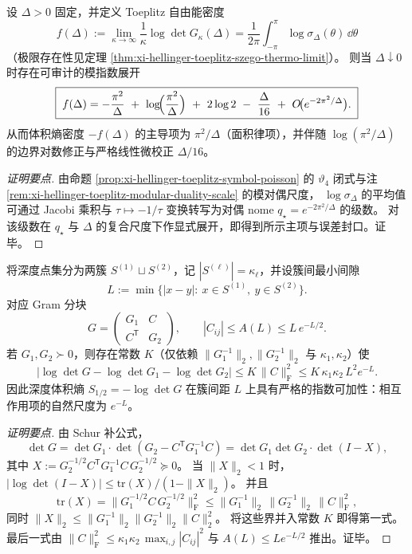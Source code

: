 \begin{theorem}\label{thm:xi-hellinger-toeplitz-free-energy-area-law}
设 \(\Delta>0\) 固定，并定义 Toeplitz 自由能密度
\[
f(\Delta):=\lim_{\kappa\to\infty}\frac{1}{\kappa}\log\det G_\kappa(\Delta)
=\frac{1}{2\pi}\int_{-\pi}^{\pi}\log\sigma_\Delta(\theta)\,\dd\theta
\]
（极限存在性见定理 \ref{thm:xi-hellinger-toeplitz-szego-thermo-limit}）。
则当 \(\Delta\downarrow0\) 时存在可审计的模指数展开
\[
\boxed{\;
f(\Delta)= -\frac{\pi^{2}}{\Delta}\ +\ \log\!\Bigl(\frac{\pi^{2}}{\Delta}\Bigr)\ +\ 2\log 2\ -\ \frac{\Delta}{16}\ +\ O\!\bigl(e^{-2\pi^{2}/\Delta}\bigr).\;}
\]
从而体积熵密度 \(-f(\Delta)\) 的主导项为 \(\pi^2/\Delta\)（面积律项），并伴随 \(\log(\pi^2/\Delta)\) 的边界对数修正与严格线性微校正 \(\Delta/16\)。
\end{theorem}
\begin{proof}[证明要点]
由命题 \ref{prop:xi-hellinger-toeplitz-symbol-poisson} 的 \(\vartheta_4\) 闭式与注 \ref{rem:xi-hellinger-toeplitz-modular-duality-scale} 的模对偶尺度，
\(\log\sigma_\Delta\) 的平均值可通过 Jacobi 乘积与 \(\tau\mapsto-1/\tau\) 变换转写为对偶 nome \(q_\star=e^{-2\pi^2/\Delta}\) 的级数。
对该级数在 \(q_\star\) 与 \(\Delta\) 的复合尺度下作显式展开，即得到所示主项与误差封口。证毕。
\end{proof}

\begin{proposition}\label{prop:xi-hellinger-gram-cluster-additivity-exp}
将深度点集分为两簇 \(S^{(1)}\sqcup S^{(2)}\)，记 \(|S^{(\ell)}|=\kappa_\ell\)，并设簇间最小间隙
\[
L:=\min\{|x-y|:\ x\in S^{(1)},\ y\in S^{(2)}\}.
\]
对应 Gram 分块
\[
G=\begin{pmatrix}G_1 & C\\ C^{\mathsf T}& G_2\end{pmatrix},
\qquad
|C_{ij}|\le A(L)\le L\,e^{-L/2}.
\]
若 \(G_1,G_2\succ0\)，则存在常数 \(K\)（仅依赖 \(\|G_1^{-1}\|_2,\|G_2^{-1}\|_2\) 与 \(\kappa_1,\kappa_2\)）使
\[
\bigl|\log\det G-\log\det G_1-\log\det G_2\bigr|
\le K\,\|C\|_{\mathrm F}^{2}
\le K\,\kappa_1\kappa_2\,L^{2}e^{-L}.
\]
因此深度体积熵 \(S_{1/2}=-\log\det G\) 在簇间距 \(L\) 上具有严格的指数可加性：相互作用项的自然尺度为 \(e^{-L}\)。
\end{proposition}
\begin{proof}[证明要点]
由 Schur 补公式，
\[
\det G=\det G_1\cdot \det(G_2-C^{\mathsf T}G_1^{-1}C)
=\det G_1\det G_2\cdot \det(I-X),
\]
其中 \(X:=G_2^{-1/2}C^{\mathsf T}G_1^{-1}C\,G_2^{-1/2}\succeq 0\)。
当 \(\|X\|_2<1\) 时，
\(
|\log\det(I-X)|\le \mathrm{tr}(X)/(1-\|X\|_2)
\)。
并且
\[
\mathrm{tr}(X)=\|G_1^{-1/2}C\,G_2^{-1/2}\|_{\mathrm F}^2
\le \|G_1^{-1}\|_2\,\|G_2^{-1}\|_2\,\|C\|_{\mathrm F}^2,
\]
同时 \(\|X\|_2\le \|G_1^{-1}\|_2\|G_2^{-1}\|_2\|C\|_2^2\)。
将这些界并入常数 \(K\) 即得第一式。
最后一式由 \(\|C\|_{\mathrm F}^2\le \kappa_1\kappa_2\,\max_{i,j}|C_{ij}|^2\) 与 \(A(L)\le L e^{-L/2}\) 推出。证毕。
\end{proof}

